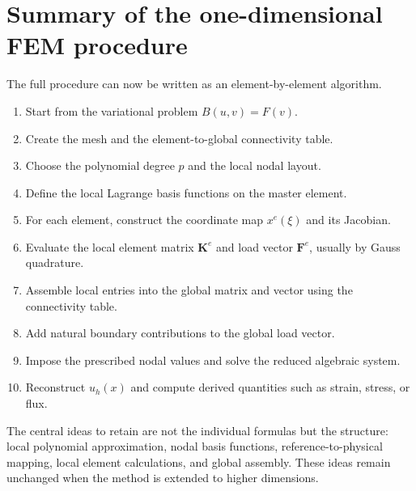 \documentclass[11pt]{article}
\newcommand{\bKe}{\mathbf{K}^{e}}
\newcommand{\bFe}{\mathbf{F}^{e}}
\begin{document}
\section{Summary of the one-dimensional FEM procedure}

The full procedure can now be written as an element-by-element algorithm.

\begin{enumerate}
\item Start from the variational problem $B(u,v)=F(v)$.
\item Create the mesh and the element-to-global connectivity table.
\item Choose the polynomial degree $p$ and the local nodal layout.
\item Define the local Lagrange basis functions on the master element.
\item For each element, construct the coordinate map $x^e(\xi)$ and its
      Jacobian.
\item Evaluate the local element matrix $\bKe$ and load vector $\bFe$, usually
      by Gauss quadrature.
\item Assemble local entries into the global matrix and vector using the
      connectivity table.
\item Add natural boundary contributions to the global load vector.
\item Impose the prescribed nodal values and solve the reduced algebraic
      system.
\item Reconstruct $u_h(x)$ and compute derived quantities such as strain,
      stress, or flux.
\end{enumerate}

The central ideas to retain are not the individual formulas but the structure:
local polynomial approximation, nodal basis functions, reference-to-physical
mapping, local element calculations, and global assembly. These ideas remain
unchanged when the method is extended to higher dimensions.
\end{document}
